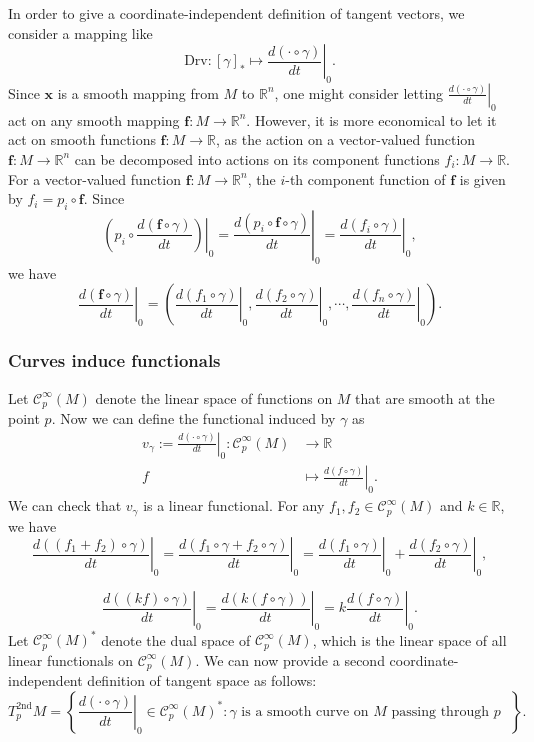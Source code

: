 \documentclass{report}
\begin{document}
In order to give a coordinate-independent definition of tangent vectors, we consider a mapping like
\[
    \mathrm{Drv}:[\gamma]_*\longmapsto\left.\frac{d(\cdot \circ \gamma)}{dt}\right|_0.
\]
Since $\mathbf{x}$ is a smooth mapping from $M$ to $\mathbb{R}^n$, one might consider letting $\left. \frac{d(\cdot \circ \gamma)}{dt} \right|_0$ act on any smooth mapping $\mathbf{f}:M\to\mathbb{R}^n$. However, it is more economical to let it act on smooth functions $\mathbf{f}:M\to\mathbb{R}$, as the action on a vector-valued function $\mathbf{f}:M\to\mathbb{R}^n$ can be decomposed into actions on its component functions $f_i:M\to\mathbb{R}$.
For a vector-valued function $\mathbf{f} : M \to \mathbb{R}^n$, the $i$-th component function of $\mathbf{f}$ is given by $f_i = p_i \circ \mathbf{f}$. Since
\[
    \left(p_i\circ\left.\frac{d(\mathbf{f} \circ \gamma)}{dt}\right)\right|_0=\left.\frac{d(p_i\circ\mathbf{f} \circ \gamma)}{dt}\right|_0=\left.\frac{d(f_i \circ \gamma)}{dt}\right|_0,
\]
we have
\[
    \left.\frac{d(\mathbf{f} \circ \gamma)}{dt}\right|_0=\left(\left.\frac{d(f_1 \circ \gamma)}{dt}\right|_0,\left.\frac{d(f_2 \circ \gamma)}{dt}\right|_0,\cdots,\left.\frac{d(f_n \circ \gamma)}{dt}\right|_0\right).
\]
\subsubsection{Curves induce functionals}
Let $\mathcal{C}^{\infty}_p(M)$ denote the linear space of functions on $M$ that are smooth at the point $p$. Now we can define the functional induced by $\gamma$ as 
\[
\begin{aligned}
    v_\gamma:=\left.\frac{d(\cdot \circ
\gamma)}{dt}\right|_0:\mathcal{C}^{\infty}_p(M)&\longrightarrow \mathbb{R}\\
    f&\longmapsto \left.\frac{d(f \circ \gamma)}{dt}\right|_0.
\end{aligned}
\]
We can check that $v_\gamma$ is a linear functional. For any $f_1,f_2\in\mathcal{C}^{\infty}_p(M)$ and $k\in\mathbb{R}$, we have
$$
\left.\frac{d((f_1+f_2) \circ \gamma)}{dt}\right|_0=\left.\frac{d(f_1\circ \gamma+f_2\circ \gamma )}{dt}\right|_0=\left.\frac{d(f_1\circ \gamma)}{dt}\right|_0+\left.\frac{d(f_2\circ \gamma)}{dt}\right|_0,
$$

$$
\left.\frac{d((kf) \circ \gamma)}{dt}\right|_0=\left.\frac{d(k(f \circ \gamma))}{dt}\right|_0=k\left.\frac{d(f \circ \gamma)}{dt}\right|_0.
$$
Let $\mathcal{C}^{\infty}_p(M)^*$ denote the dual space of $\mathcal{C}^{\infty}_p(M)$, which is the linear space of all linear functionals on $\mathcal{C}^{\infty}_p(M)$. We can now provide a second coordinate-independent definition of tangent space as follows:
$$
T^{2\mathrm{nd}}_pM=\left\{\left.\frac{d(\cdot \circ \gamma)}{dt}\right|_0\in\mathcal{C}^{\infty}_p(M)^*:\gamma\text{ is a smooth curve on $M$ passing through $p$ }\right\}.
$$
\end{document}
